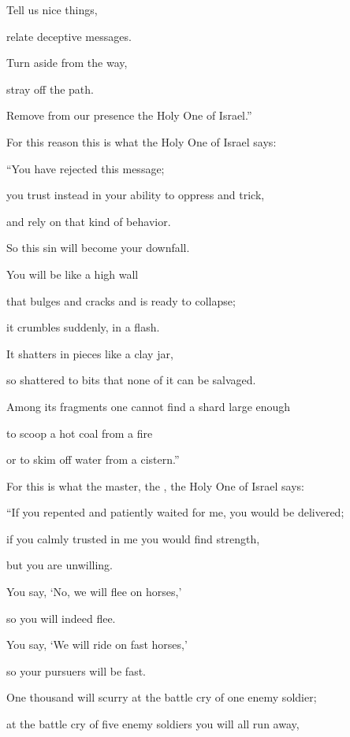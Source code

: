 {\par }{\Q Tell
us nice things,
\par }{\Q relate deceptive messages.
\par }{\Q {}Turn aside
from
the way,
\par }{\Q stray
off the path.
\par }{\Q Remove
from our
presence
the Holy One
of Israel.”
\par }{\Q {}For this reason
this is what
the Holy One
of Israel
says:
\par }{\Q “You have rejected
this
message;
\par }{\Q you trust
instead in your ability
to oppress and trick,
\par }{\Q and rely
on that kind of behavior.
\par }{\Q {}So
this
sin
will become
your downfall.
\par }{\Q You will be like a high
wall
\par }{\Q that bulges and cracks
and is ready to collapse;
\par }{\Q it crumbles
suddenly,
in a flash.
\par }{\Q {}It shatters
in pieces
like a clay
jar,
\par }{\Q so shattered to bits
that none
of it can be salvaged.
\par }{\Q Among its fragments
one cannot
find
a shard
large enough

\par }{\Q to scoop
a hot coal
from a fire
\par }{\Q or to skim off
water
from a cistern.”
\par }{\Q {}For
this is what
the master,
the
{}, the Holy
One of Israel
says:
\par }{\Q “If you repented
and patiently waited
for me, you would be
delivered;
\par }{\Q if you calmly
trusted
in me you would find strength,
\par }{\Q but you are unwilling.
\par }{\Q {}You say,
‘No,
we
will flee
on
horses,’
\par }{\Q so
you will indeed flee.
\par }{\Q You say, ‘We will ride
on
fast horses,’
\par }{\Q so
your pursuers
will be fast.
\par }{\Q {}One
thousand
will scurry
at the battle cry of one
enemy soldier;

\par }{\Q at
the battle cry
of five
enemy soldiers you will all run
away,

}
